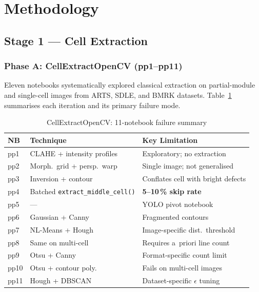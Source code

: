 \documentclass[conference]{IEEEtran}
\begin{document}
\section{Methodology}
\label{sec:method}

\subsection{Stage 1 --- Cell Extraction}
\label{sec:stage1}

\subsubsection{Phase A: CellExtractOpenCV (pp1--pp11)}

Eleven notebooks systematically explored classical extraction
on partial-module and single-cell images from ARTS, SDLE, and
BMRK datasets. Table~\ref{tab:classical_cell} summarises each
iteration and its primary failure mode.

\begin{table}[t]
  \caption{CellExtractOpenCV: 11-notebook failure summary}
  \label{tab:classical_cell}
  \begin{center}
  \renewcommand{\arraystretch}{1.05}
  \small
  \begin{tabular}{p{0.75cm}p{2.0cm}p{3.55cm}}
    \toprule
    \textbf{NB} & \textbf{Technique} &
    \textbf{Key Limitation} \\
    \midrule
    pp1  & CLAHE + intensity profiles & Exploratory; no extraction \\
    pp2  & Morph.\ grid + persp.\ warp & Single image; not generalised \\
    pp3  & Inversion + contour & Conflates cell with bright defects \\
    pp4  & Batched \texttt{extract\_middle\_cell()} & \textbf{5--10\,\% skip rate} \\
    pp5  & ---  & YOLO pivot notebook \\
    pp6  & Gaussian + Canny & Fragmented contours \\
    pp7  & NL-Means + Hough & Image-specific dist.\ threshold \\
    pp8  & Same on multi-cell & Requires a~priori line count \\
    pp9  & Otsu + Canny & Format-specific count limit \\
    pp10 & Otsu + contour poly. & Fails on multi-cell images \\
    pp11 & Hough + DBSCAN & Dataset-specific $\epsilon$ tuning \\
    \bottomrule
  \end{tabular}
  \end{center}
\end{table}
\end{document}
